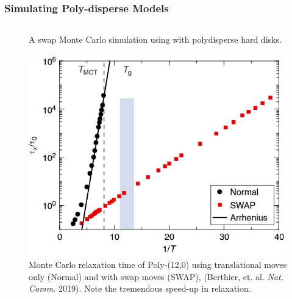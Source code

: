 \begin{frame}
\frametitle{Simulating Poly-disperse Models}

\begin{columns}
\begin{column}{0.6\textwidth}
\begin{figure}
\begin{overprint}
\centering{}
\caption{A swap Monte Carlo simulation using with polydisperse hard disks.} 

\centering\includegraphics[width=0.80\linewidth]{backup-simulationdetails/poly12_berthier_tau.PNG}\caption{Monte Carlo relaxation time of Poly-(12,0) using translational moves only (Normal) and with swap moves (SWAP), (Berthier, et. al. \textit{Nat. Comm.} 2019). Note the tremendous speed-up in relaxation.}


\end{overprint}
\end{figure}
\end{column}
\end{columns}
\end{frame}
